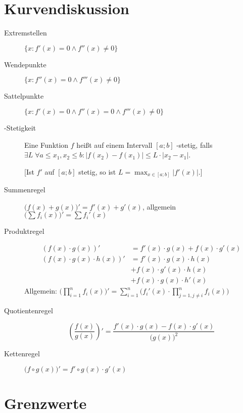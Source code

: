 \section{Kurvendiskussion}
\begin{description}
  \item [Extremstellen] 
	$\{ x : f'(x)=0 \land f''(x) \neq 0 \} $
  \item [Wendepunkte] 
	$\{ x : f''(x) = 0 \land f'''(x) \neq 0 \} $
  \item [Sattelpunkte] 
	$\{ x : f'(x) = 0 \land f''(x) = 0 \land f'''(x) \neq 0 \} $
  \item [-Stetigkeit] 
	Eine Funktion $f$ heißt auf einem Intervall $[a;b]$ -stetig, falls $\exists L\; \forall a \leq x_1,x_2 \leq b : \lvert f(x_2)-f(x_1) \rvert \leq L \cdot \lvert x_2-x_1 \rvert$.

    [Ist $f'$ auf $[a;b]$ stetig, so ist $L=\max_{x\in[a;b]}|f'(x)|$.]

  \item [Summenregel] 
	$\bigl(f(x)+g(x)\bigr)' = f'(x)+g'(x)$, allgemein $ \bigl(\sum f_i(x)\bigr)'= \sum f_i'(x) $
  \item [Produktregel] 
	\begin{align*}
		(f(x) \cdot g(x))'            & = f'(x)\cdot g(x) + f(x) \cdot g'(x) \\
		(f(x) \cdot g(x) \cdot h(x))' & = f'(x)\cdot g(x)  \cdot h(x)        \\
		                              & + f(x) \cdot g'(x) \cdot h(x)        \\
		                              & + f(x) \cdot g(x)  \cdot h'(x)
	\end{align*}
	Allgemein: $ \bigl(\prod_{i=1}^n f_i(x)\bigr)' = \sum_{i=1}^n \bigl(f_i'(x) \cdot \prod_{j=1,j\neq i}^n f_i(x)\bigr) $
  \item [Quotientenregel] 
	\[ \left(\frac{f(x)}{g(x)}\right)'=\frac{f'(x)\cdot g(x)-f(x)\cdot g'(x)}{\bigl(g(x)\bigr)^2} \]
  \item [Kettenregel] 
	$\bigl(f \circ g(x)\bigr)'=f' \circ g(x) \cdot g'(x)$
\end{description}

\section{Grenzwerte}

